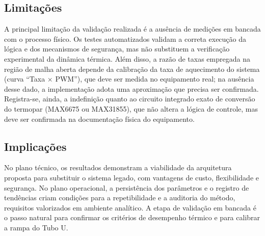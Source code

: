 \subsection{Limita\c{c}\~oes}

A principal limita\c{c}\~ao da valida\c{c}\~ao realizada \'e a aus\^encia de
medi\c{c}\~oes em bancada com o processo f\'isico. Os testes automatizados
validam a correta execu\c{c}\~ao da l\'ogica e dos mecanismos de seguran\c{c}a,
mas n\~ao substituem a verifica\c{c}\~ao experimental da din\^amica t\'ermica.
Al\'em disso, a raz\~ao de taxas empregada na regi\~ao de malha aberta depende da
calibra\c{c}\~ao da taxa de aquecimento do sistema (curva ``Taxa $\times$ PWM''),
que deve ser medida no equipamento real; na aus\^encia desse dado, a
implementa\c{c}\~ao adota uma aproxima\c{c}\~ao que precisa ser confirmada.
Registra-se, ainda, a indefini\c{c}\~ao quanto ao circuito integrado exato de
convers\~ao do termopar (MAX6675 ou MAX31855), que n\~ao altera a l\'ogica de
controle, mas deve ser confirmada na documenta\c{c}\~ao f\'isica do equipamento.

\subsection{Implica\c{c}\~oes}

No plano t\'ecnico, os resultados demonstram a viabilidade da arquitetura
proposta para substituir o sistema legado, com vantagens de custo, flexibilidade
e seguran\c{c}a. No plano operacional, a persist\^encia dos par\^ametros e o
registro de tend\^encias criam condi\c{c}\~oes para a repetibilidade e a
auditoria do m\'etodo, requisitos valorizados em ambiente anal\'itico. A etapa de
valida\c{c}\~ao em bancada \'e o passo natural para confirmar os crit\'erios de
desempenho t\'ermico e para calibrar a rampa do Tubo U.
